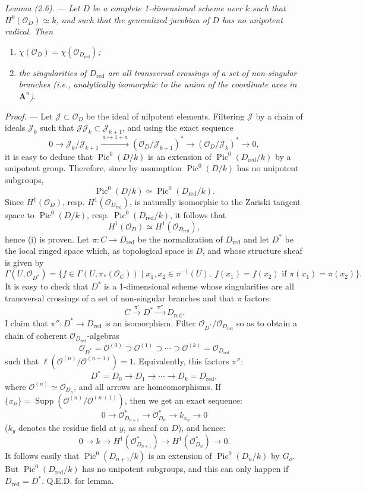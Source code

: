 \documentclass[10pt]{article}
\newcommand{\Pic}{\operatorname{Pic}}
\newcommand{\cO}{\mathcal O}
\newcommand{\A}{\mathbf A}
\begin{document}
\medskip
\noindent\emph{Lemma (2.6).} --- \emph{Let $D$ be a complete 1-dimensional scheme over $k$ such that $H^0(\cO_D)\simeq k$, and such that the generalized jacobian of $D$ has no unipotent radical. Then}
\begin{enumerate}[label=(\roman*)]
\item \emph{$\chi(\cO_D)=\chi(\cO_{D_{\mathrm{red}}})$;}
\item \emph{the singularities of $D_{\mathrm{red}}$ are all transversal crossings of a set of non-singular branches (i.e., analytically isomorphic to the union of the coordinate axes in $\A^n$).}
\end{enumerate}

\noindent\emph{Proof.} --- Let $\mathcal J\subset \cO_D$ be the ideal of nilpotent elements. Filtering $\mathcal J$ by a chain of ideals $\mathcal J_k$ such that $\mathcal J\mathcal J_k\subset\mathcal J_{k+1}$, and using the exact sequence
\[
0\longrightarrow \mathcal J_k/\mathcal J_{k+1}
\xrightarrow{\ a\mapsto 1+a\ }
(\cO_D/\mathcal J_{k+1})^*\longrightarrow (\cO_D/\mathcal J_k)^*\longrightarrow 0,
\]
it is easy to deduce that $\Pic^0(D/k)$ is an extension of $\Pic^0(D_{\mathrm{red}}/k)$ by a unipotent group. Therefore, since by assumption $\Pic^0(D/k)$ has no unipotent subgroups,
\[
\Pic^0(D/k)\simeq\Pic^0(D_{\mathrm{red}}/k).
\]
Since $H^1(\cO_D)$, resp. $H^1(\cO_{D_{\mathrm{red}}})$, is naturally isomorphic to the Zariski tangent space to $\Pic^0(D/k)$, resp. $\Pic^0(D_{\mathrm{red}}/k)$, it follows that
\[
H^1(\cO_D)\simeq H^1(\cO_{D_{\mathrm{red}}}),
\]
hence (i) is proven. Let $\pi:C\to D_{\mathrm{red}}$ be the normalization of $D_{\mathrm{red}}$ and let $D^*$ be the local ringed space which, as topological space is $D$, and whose structure sheaf is given by
\[
\Gamma(U,\cO_{D^*})=
\{f\in\Gamma(U,\pi_*(\cO_C))\mid x_1,x_2\in\pi^{-1}(U),\ f(x_1)=f(x_2)\text{ if }\pi(x_1)=\pi(x_2)\}.
\]
It is easy to check that $D^*$ is a 1-dimensional scheme whose singularities are all transversal crossings of a set of non-singular branches and that $\pi$ factors:
\[
C\xrightarrow{\ \pi'\ }D^*\xrightarrow{\ \pi''\ }D_{\mathrm{red}}.
\]
I claim that $\pi'':D^*\to D_{\mathrm{red}}$ is an isomorphism. Filter $\cO_{D^*}/\cO_{D_{\mathrm{red}}}$ so as to obtain a chain of coherent $\cO_{D_{\mathrm{red}}}$-algebras
\[
\cO_{D^*}=\cO^{(0)}\supset \cO^{(1)}\supset\cdots\supset \cO^{(k)}=\cO_{D_{\mathrm{red}}}
\]
such that $\ell(\cO^{(n)}/\cO^{(n+1)})=1$. Equivalently, this factors $\pi''$:
\[
D^*=D_0\longrightarrow D_1\longrightarrow\cdots\longrightarrow D_k=D_{\mathrm{red}},
\]
where $\cO^{(n)}\simeq\cO_{D_n}$, and all arrows are homeomorphisms. If $\{x_n\}=\operatorname{Supp}(\cO^{(n)}/\cO^{(n+1)})$, then we get an exact sequence:
\[
0\longrightarrow \cO_{D_{n+1}}^*\longrightarrow \cO_{D_n}^*\longrightarrow k_{x_n}\longrightarrow 0
\]
($k_y$ denotes the residue field at $y$, as sheaf on $D$), and hence:
\[
0\longrightarrow k\longrightarrow H^1(\cO_{D_{n+1}}^*)\longrightarrow H^1(\cO_{D_n}^*)\longrightarrow 0.
\]
It follows easily that $\Pic^0(D_{n+1}/k)$ is an extension of $\Pic^0(D_n/k)$ by $G_a$. But $\Pic^0(D_{\mathrm{red}}/k)$ has no unipotent subgroups, and this can only happen if $D_{\mathrm{red}}=D^*$. Q.E.D. for lemma.
\end{document}
